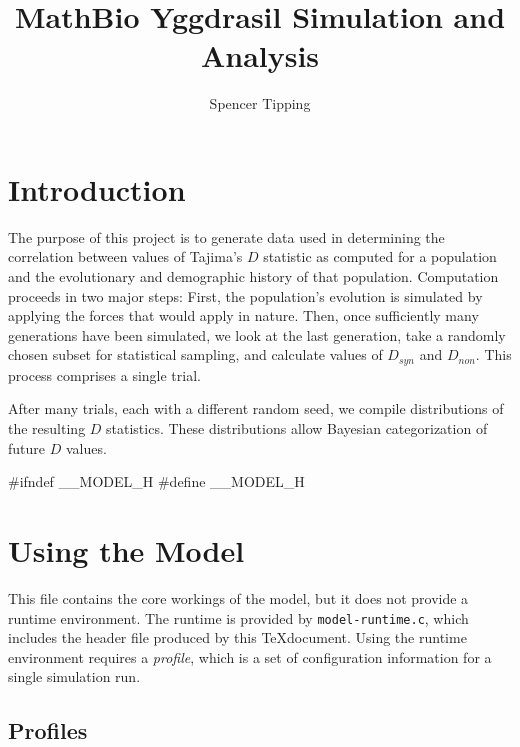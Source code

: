 \documentclass{article}
\begin{document}
  \title{MathBio Yggdrasil Simulation and Analysis}
  \author{Spencer Tipping}
  \maketitle

  \tableofcontents

  \def\D{$D$}
  \def\Ds{$D_{syn}$}
  \def\Dn{$D_{non}$}

  \section{Introduction}
    \label{sec:introduction}

    The purpose of this project is to generate data used in determining the
    correlation between values of Tajima's \D{} statistic as computed for a
    population and the evolutionary and demographic history of that population.
    Computation proceeds in two major steps: First, the population's evolution
    is simulated by applying the forces that would apply in nature. Then, once
    sufficiently many generations have been simulated, we look at the last
    generation, take a randomly chosen subset for statistical sampling, and
    calculate values of \Ds{} and \Dn. This process comprises a single trial.

    After many trials, each with a different random seed, we compile
    distributions of the resulting \D{} statistics. These distributions allow
    Bayesian categorization of future \D{} values.

\begin{ccode}
#ifndef __MODEL_H
#define __MODEL_H
\end{ccode}

  \section{Using the Model}
    \label{sec:using}

    This file contains the core workings of the model, but it does not provide a
    runtime environment. The runtime is provided by \verb|model-runtime.c|,
    which includes the header file produced by this \TeX document. Using the
    runtime environment requires a {\em profile}, which is a set of
    configuration information for a single simulation run.

    \subsection{Profiles}
      \label{sec:profiles}
\end{document}
